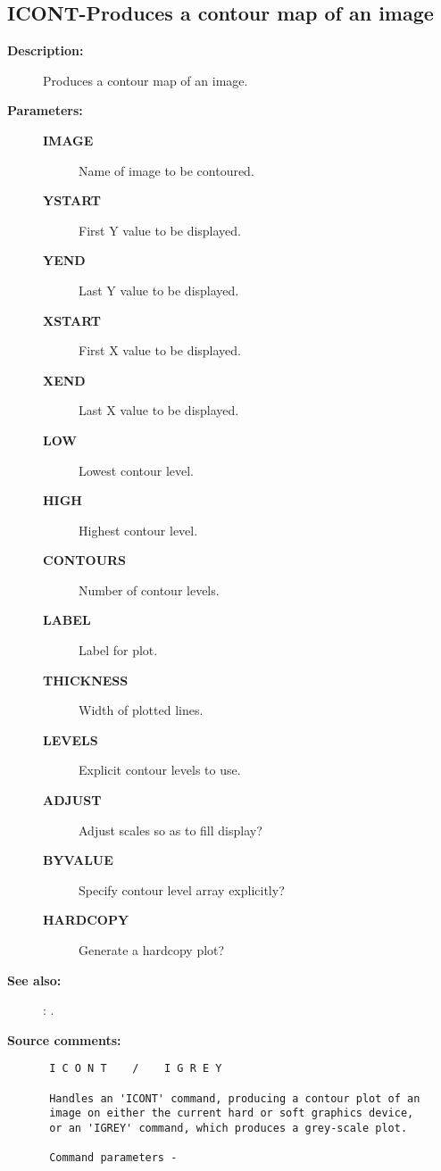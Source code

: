 \subsection{ICONT-\label{ICONT}Produces a contour map of an image}
\begin{description}

\item [{\bf Description:}]
 Produces a contour map of an image.

\item [{\bf Parameters:}]
\begin{description}
\item [{\bf IMAGE}]
 Name of image to be contoured.
\item [{\bf YSTART}]
 First Y value to be displayed.
\item [{\bf YEND}]
 Last Y value to be displayed.
\item [{\bf XSTART}]
 First X value to be displayed.
\item [{\bf XEND}]
 Last X value to be displayed.
\item [{\bf LOW}]
 Lowest contour level.
\item [{\bf HIGH}]
 Highest contour level.
\item [{\bf CONTOURS}]
 Number of contour levels.
\item [{\bf LABEL}]
 Label for plot.
\item [{\bf THICKNESS}]
 Width of plotted lines.
\item [{\bf LEVELS}]
 Explicit contour levels to use.
\item [{\bf ADJUST}]
 Adjust scales so as to fill display?
\item [{\bf BYVALUE}]
 Specify contour level array explicitly?
\item [{\bf HARDCOPY}]
 Generate a hardcopy plot?
\end{description}

\item [{\bf See also:}]
: .\\

\item [{\bf Source comments:}]
\begin{verbatim}
 I C O N T    /    I G R E Y

 Handles an 'ICONT' command, producing a contour plot of an
 image on either the current hard or soft graphics device,
 or an 'IGREY' command, which produces a grey-scale plot.

 Command parameters -


\end{verbatim}
\end{description}
